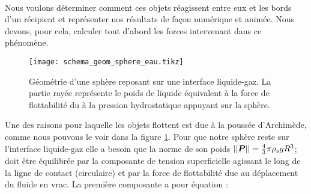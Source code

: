     \paragraph*{}{
        Nous voulons déterminer comment ces objets réagissent entre eux et les bords d'un récipient et représenter nos résultats de façon numérique et animée. Nous devons, pour cela, calculer tout d'abord les forces intervenant dans ce phénomène.
    } 



    
    \begin{figure}[!htb]
        \centering
        \texttt{[image: schema\_geom\_sphere\_eau.tikz]}
        \caption{Géométrie d'une sphère reposant sur une interface liquide-gaz. La partie rayée représente le poids de liquide équivalent à la force de flottabilité du à la pression hydrostatique appuyant sur la sphère. }
        \label{geom_sphere}
    \end{figure}

    Une des raisons pour laquelle les objets flottent est due à la poussée d'Archimède, comme nous pouvons le voir dans la figure \ref{geom_sphere}. Pour que notre sphère reste sur l'interface liquide-gaz elle a besoin que la norme de son poids \(||\vb*{P}||=\frac{4}{3}\pi\rho_{s}gR^3\); doit être équilibrée par la composante de tension superficielle agissant le long de la ligne de contact (circulaire) et par la force de flottabilité due au déplacement du fluide en vrac. La première composante a pour équation :

